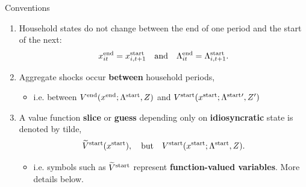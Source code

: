 \documentclass[10pt,aspectratio=169]{beamer}
\begin{document}
\begin{frame}{Conventions}
  \begin{enumerate}
    \item Household states do not change between the end of one period and the start of the next:
    \[
      x^{\mathrm{end}}_{it} = x^{\mathrm{start}}_{i,t+1}\quad\text{and}\quad\Lambda^{\mathrm{end}}_{it} = \Lambda^{\mathrm{start}}_{i,t+1}.
    \]
    \item Aggregate shocks occur \textbf{between} household periods,
    \begin{itemize}
      \item i.e. between $V^{\mathrm{end}}(x^{\mathrm{end}}; \Lambda^{\mathrm{start}}, Z)$ and $V^{\mathrm{start}}(x^{\mathrm{start}}; \Lambda^{\mathrm{start}}{}', Z')$
    \end{itemize}
    \item A value function \textbf{slice} or \textbf{guess} depending only on \textbf{idiosyncratic} state is denoted by tilde,
    \[
      \widetilde{V}^{\mathrm{start}}(x^{\mathrm{start}}), \quad\text{but}\quad V^{\mathrm{start}}(x^{\mathrm{start}}; \Lambda^{\mathrm{start}}, Z).
    \]
    \begin{itemize}
      \item i.e. symbols such as $\widetilde{V}^{\mathrm{start}}$ represent \textbf{function-valued variables}. More details below.
    \end{itemize}
  \end{enumerate}
\end{frame}
\end{document}
